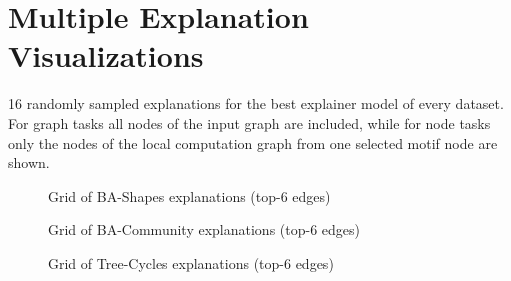 \clearpage
\section{Multiple Explanation Visualizations}
16 randomly sampled explanations for the best explainer model of every dataset. For graph tasks all nodes of the input graph are included, while for node tasks only the nodes of the local computation graph from one selected motif node are shown.

\begin{figure}[htbp]
    \centering
    \caption{Grid of BA-Shapes explanations (top-6 edges)}
    \label{fig:grid-BA-Shapes-explanations}
\end{figure}

\begin{figure}[htbp]
    \centering
    \caption{Grid of BA-Community explanations (top-6 edges)}
    \label{fig:grid-BA-Community-explanations}
\end{figure}

\begin{figure}[htbp]
    \centering
    \caption{Grid of Tree-Cycles explanations (top-6 edges)}
    \label{fig:grid-Tree-Cycles-explanations}
\end{figure}

